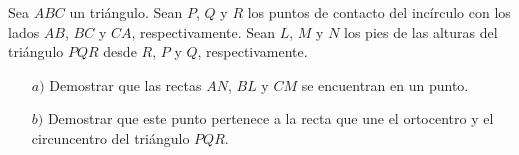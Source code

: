 Sea $ABC$ un triángulo. Sean $P$, $Q$ y $R$ los puntos de contacto del incírculo con los lados $AB$, $BC$ y $CA$, respectivamente. Sean $L$, $M$ y $N$ los pies de las alturas del triángulo $PQR$ desde $R$, $P$ y $Q$, respectivamente.
\begin{enumerate}
    \item[$a)$]  Demostrar que las rectas $AN$, $BL$ y $CM$ se encuentran en un punto. 
    \item[$b)$]  Demostrar que este punto pertenece a la recta que une el ortocentro y el circuncentro del triángulo $PQR$.
\end{enumerate}
